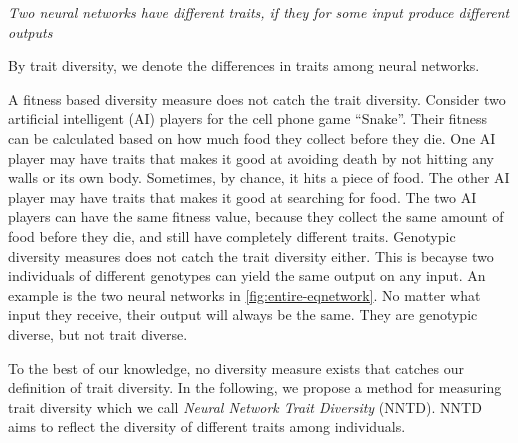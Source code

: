 \emph{Two neural networks have different traits, if they for some input produce different outputs}

By trait diversity, we denote the differences in traits among neural networks.

A fitness based diversity measure does not catch the trait diversity. Consider two artificial intelligent (AI) players for the cell phone game ``Snake''. Their fitness can be calculated based on how much food they collect before they die. One AI player may have traits that makes it good at avoiding death by not hitting any walls or its own body. Sometimes, by chance, it hits a piece of food. The other AI player may have traits that makes it good at searching for food. The two AI players can have the same fitness value, because they collect the same amount of food before they die, and still have completely different traits.
Genotypic diversity measures does not catch the trait diversity either. This is becayse two individuals of different genotypes can yield the same output on any input. An example is the two neural networks in \cref{fig:entire-eqnetwork}. No matter what input they receive, their output will always be the same. They are genotypic diverse, but not trait diverse.

%

%

To the best of our knowledge, no diversity measure exists that catches our definition of trait diversity.
In the following, we propose a method for measuring trait diversity which we call \emph{Neural Network Trait Diversity} (NNTD). 
NNTD aims to reflect the diversity of different traits among individuals. 